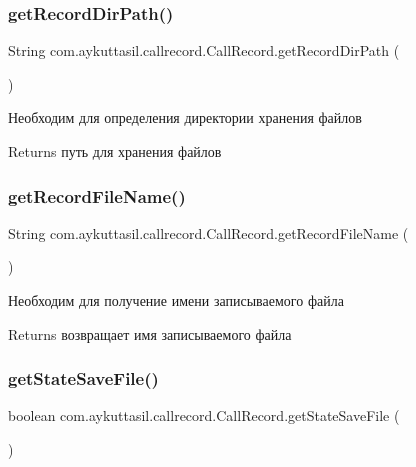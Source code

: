 \subsubsection{\texorpdfstring{get\+Record\+Dir\+Path()}{getRecordDirPath()}}
{\footnotesize\ttfamily String com.\+aykuttasil.\+callrecord.\+Call\+Record.\+get\+Record\+Dir\+Path (\begin{DoxyParamCaption}{ }\end{DoxyParamCaption})}

Необходим для определения директории хранения файлов \begin{DoxyReturn}{Returns}
путь для хранения файлов 
\end{DoxyReturn}
\mbox{\label{classcom_1_1aykuttasil_1_1callrecord_1_1_call_record_a05ca6a80ce9f6477b5ab6c8475eb6867}} 
\subsubsection{\texorpdfstring{get\+Record\+File\+Name()}{getRecordFileName()}}
{\footnotesize\ttfamily String com.\+aykuttasil.\+callrecord.\+Call\+Record.\+get\+Record\+File\+Name (\begin{DoxyParamCaption}{ }\end{DoxyParamCaption})}

Необходим для получение имени записываемого файла \begin{DoxyReturn}{Returns}
возвращает имя записываемого файла 
\end{DoxyReturn}
\mbox{\label{classcom_1_1aykuttasil_1_1callrecord_1_1_call_record_a3fe28aee7367f67e6d34a11dcdd10673}} 
\subsubsection{\texorpdfstring{get\+State\+Save\+File()}{getStateSaveFile()}}
{\footnotesize\ttfamily boolean com.\+aykuttasil.\+callrecord.\+Call\+Record.\+get\+State\+Save\+File (\begin{DoxyParamCaption}{ }\end{DoxyParamCaption})}

